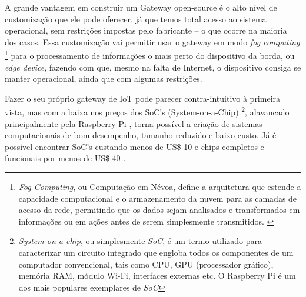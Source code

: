 A grande vantagem em construir um Gateway open-source é o alto nível de customização que ele pode oferecer, já que temos total acesso ao sistema operacional, sem restrições impostas pelo fabricante – o que ocorre na maioria dos casos. Essa customização vai permitir usar o gateway em modo \textit{fog computing} \footnote{\textit{Fog Computing}, ou Computação em Névoa, define a arquitetura que estende a capacidade computacional e o armazenamento da nuvem para as camadas de acesso da rede, permitindo que os dados sejam analisados e transformados em informações ou em ações antes de serem simplesmente transmitidos. \cite{CIOIDG}} para o processamento de informações o mais perto do dispositivo da borda, ou \textit{edge device}, fazendo com que, mesmo na falta de Internet, o dispositivo consiga se manter operacional, ainda que com algumas restrições.

Fazer o seu próprio gateway de IoT pode parecer contra-intuitivo à primeira vista, mas com a baixa nos preços dos SoC’s (System-on-a-Chip) \footnote{\textit{System-on-a-chip}, ou simplesmente \textit{SoC}, é um termo utilizado para caracterizar um circuito integrado que engloba todos os componentes de um computador convencional, tais como CPU, GPU (processador gráfico), memória RAM, módulo Wi-Fi, interfaces externas etc. O Raspberry Pi é um dos mais populares exemplares de \textit{SoC}}, alavancado principalmente pela Raspberry Pi \cite{RaspberryPi}, torna possível a criação de sistemas computacionais de bom desempenho, tamanho reduzido e baixo custo. Já é possível encontrar SoC’s custando menos de US\$ 10 e chips completos e funcionais por menos de US\$ 40 \cite{RaspberryPiVenda}.